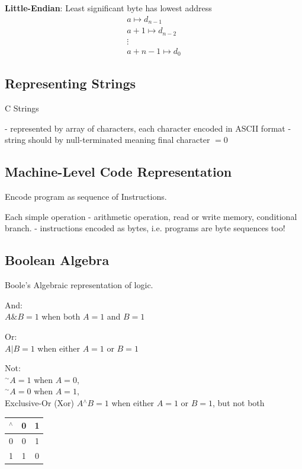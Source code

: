 \documentclass[10pt]{amsart}
\begin{document}
\begin{multicols*}{2}
\textbf{Little-Endian}: Least significant byte has lowest address
\[
\begin{gathered}
a \mapsto d_{n-1}  \\
a+1 \mapsto d_{n-2} \\
\vdots \\
a+n -1 \mapsto d_0
\end{gathered}
\]

\subsection{Representing Strings}

C Strings

- represented by array of characters, each character encoded in ASCII format 
- string should by null-terminated meaning final character $=0$

\subsection{Machine-Level Code Representation}

Encode program as sequence of Instructions. 

Each simple operation
- arithmetic operation, read or write memory, conditional branch.
- instructions encoded as bytes, 
i.e. programs are byte sequences too!

\subsection{Boolean Algebra}

Boole's Algebraic representation of logic.

And: \\
$A \& B = 1$ when both $A=1$ and $B=1$

Or: \\
$A | B = 1$ when either $A=1$ or $B=1$

Not: \\
${}^{\sim}A= 1$ when $A=0$, \\
${}^{\sim}A= 0$ when $A=1$, \\

Exclusive-Or (Xor)
$A {}^{\wedge} B = 1$ when either $A=1$ or $B=1$, but not both

\begin{center}
	\begin{tabular}{ l | c  c }
		${}^{\wedge}$ & 0 & 1 \\ \hline 
		0 & 0 & 1 \\
		1 & 1 & 0
	\end{tabular}
\end{center}


\end{multicols*}
\end{document}
